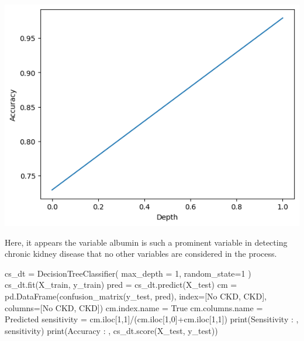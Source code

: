 \documentclass[
  11pt,
  letterpaper,
  DIV=11,
  numbers=noendperiod]{scrartcl}
\newenvironment{Shaded}{\begin{snugshade}}{\end{snugshade}}
\newcommand{\BuiltInTok}[1]{\textcolor[rgb]{0.00,0.23,0.31}{#1}}
\newcommand{\DecValTok}[1]{\textcolor[rgb]{0.68,0.00,0.00}{#1}}
\newcommand{\NormalTok}[1]{\textcolor[rgb]{0.00,0.23,0.31}{#1}}
\newcommand{\OperatorTok}[1]{\textcolor[rgb]{0.37,0.37,0.37}{#1}}
\newcommand{\StringTok}[1]{\textcolor[rgb]{0.13,0.47,0.30}{#1}}
\begin{document}
\includegraphics{Seebach_Lily_HW6_files/figure-pdf/cell-22-output-1.png}

Here, it appears the variable albumin is such a prominent variable in
detecting chronic kidney disease that no other variables are considered
in the process.

\begin{Shaded}
\begin{Highlighting}[]
\NormalTok{cs\_dt }\OperatorTok{=}\NormalTok{ DecisionTreeClassifier(}
\NormalTok{    max\_depth }\OperatorTok{=} \DecValTok{1}\NormalTok{,}
\NormalTok{    random\_state}\OperatorTok{=}\DecValTok{1}
\NormalTok{) }
\NormalTok{cs\_dt.fit(X\_train, y\_train)}
\NormalTok{pred }\OperatorTok{=}\NormalTok{ cs\_dt.predict(X\_test)}
\NormalTok{cm }\OperatorTok{=}\NormalTok{ pd.DataFrame(confusion\_matrix(y\_test, pred), index}\OperatorTok{=}\NormalTok{[}\StringTok{\textquotesingle{}No CKD\textquotesingle{}}\NormalTok{, }\StringTok{\textquotesingle{}CKD\textquotesingle{}}\NormalTok{], columns}\OperatorTok{=}\NormalTok{[}\StringTok{\textquotesingle{}No CKD\textquotesingle{}}\NormalTok{, }\StringTok{\textquotesingle{}CKD\textquotesingle{}}\NormalTok{])}
\NormalTok{cm.index.name }\OperatorTok{=} \StringTok{\textquotesingle{}True\textquotesingle{}}
\NormalTok{cm.columns.name }\OperatorTok{=} \StringTok{\textquotesingle{}Predicted\textquotesingle{}}
\NormalTok{sensitivity }\OperatorTok{=}\NormalTok{ cm.iloc[}\DecValTok{1}\NormalTok{,}\DecValTok{1}\NormalTok{]}\OperatorTok{/}\NormalTok{(cm.iloc[}\DecValTok{1}\NormalTok{,}\DecValTok{0}\NormalTok{]}\OperatorTok{+}\NormalTok{cm.iloc[}\DecValTok{1}\NormalTok{,}\DecValTok{1}\NormalTok{])}
\BuiltInTok{print}\NormalTok{(}\StringTok{\textquotesingle{}Sensitivity : \textquotesingle{}}\NormalTok{, sensitivity)}
\BuiltInTok{print}\NormalTok{(}\StringTok{\textquotesingle{}Accuracy : \textquotesingle{}}\NormalTok{, cs\_dt.score(X\_test, y\_test))}
\end{Highlighting}
\end{Shaded}
\end{document}

